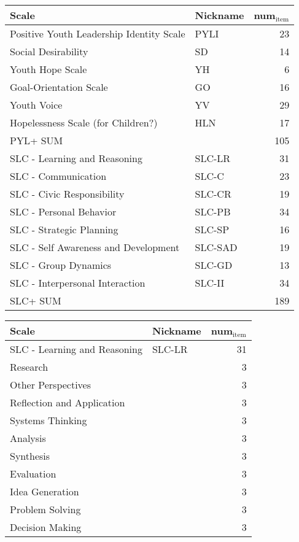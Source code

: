 \documentclass[11pt]{article}
\author{alex}
\date{\today}
\title{}
\begin{document}
\tableofcontents

\begin{center}
\begin{tabular}{llr}
\hline
Scale & Nickname & num\(_{\text{item}}\)\\
\hline
\hline
Positive Youth Leadership Identity Scale & PYLI & 23\\
Social Desirability & SD & 14\\
Youth Hope Scale & YH & 6\\
Goal-Orientation Scale & GO & 16\\
Youth Voice & YV & 29\\
Hopelessness Scale (for Children?) & HLN & 17\\
\hline
PYL+ SUM &  & 105\\
\hline
SLC - Learning and Reasoning & SLC-LR & 31\\
SLC - Communication & SLC-C & 23\\
SLC - Civic Responsibility & SLC-CR & 19\\
SLC - Personal Behavior & SLC-PB & 34\\
SLC - Strategic Planning & SLC-SP & 16\\
SLC - Self Awareness and Development & SLC-SAD & 19\\
SLC - Group Dynamics & SLC-GD & 13\\
SLC - Interpersonal Interaction & SLC-II & 34\\
\hline
SLC+ SUM &  & 189\\
\end{tabular}
\end{center}


\begin{center}
\begin{tabular}{llr}
Scale & Nickname & num\(_{\text{item}}\)\\
\hline
SLC - Learning and Reasoning & SLC-LR & 31\\
\hline
Research &  & 3\\
Other Perspectives &  & 3\\
Reflection and Application &  & 3\\
Systems Thinking &  & 3\\
Analysis &  & 3\\
Synthesis &  & 3\\
Evaluation &  & 3\\
Idea Generation &  & 3\\
Problem Solving &  & 3\\
Decision Making &  & 3\\
\end{tabular}
\end{center}
\end{document}
